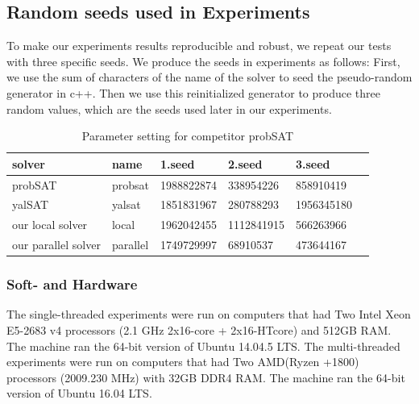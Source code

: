 \documentclass[12pt,a4paper,twoside]{scrartcl}
\numberwithin{equation}{section}
\begin{document}
\subsection{Random seeds used in Experiments}
To make our experiments results reproducible and robust, we repeat our tests with three specific seeds. We produce the seeds in experiments as follows: First, we use the sum of characters of the name of the solver to seed the pseudo-random generator in c++.  Then we use this reinitialized generator to produce three random values, which are the seeds used later in our experiments. 
\begin{table}[h!]
\begin{center}
    \begin{tabular}{|l|l|l|l|l|p{1cm}|}
\hline 
    solver&name&1.seed&2.seed&3.seed \\ \hline
	probSAT&probsat&1988822874&338954226 &858910419 \\ \hline
	yalSAT &yalsat&1851831967&280788293&1956345180 \\ \hline
	our local solver & local&1962042455&1112841915&566263966 \\ \hline
	our parallel solver & parallel &1749729997& 68910537& 473644167 \\ \hline
	
\end{tabular}
\caption[probSAT]{Parameter setting for competitor probSAT}
\end{center}
\end{table} 
\subsubsection{Soft- and Hardware}
The single-threaded experiments were run on computers that had Two Intel Xeon E5-2683 v4 processors  (2.1 GHz 2x16-core + 2x16-HTcore) and 512GB RAM. The machine ran the 64-bit version
of  Ubuntu 14.04.5 LTS. The multi-threaded experiments were run on computers that had Two AMD(Ryzen +1800) processors (2009.230 MHz) with 32GB DDR4 RAM. The machine ran the 64-bit version of Ubuntu 16.04 LTS. 
\end{document}
